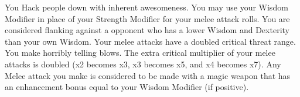 \combatfeat
{You Hack people down with inherent awesomeness.}
{You may use your Wisdom Modifier in place of your Strength Modifier for your melee attack rolls.}
{You are considered flanking against a opponent who has a lower Wisdom and Dexterity than your own Wisdom.}
{Your melee attacks have a doubled critical threat range.}
{You make horribly telling blows. The extra critical multiplier of your melee attacks is doubled (x2 becomes x3, x3 becomes x5, and x4 becomes x7).}
{Any Melee attack you make is considered to be made with a magic weapon that has an enhancement bonus equal to your Wisdom Modifier (if positive).}
